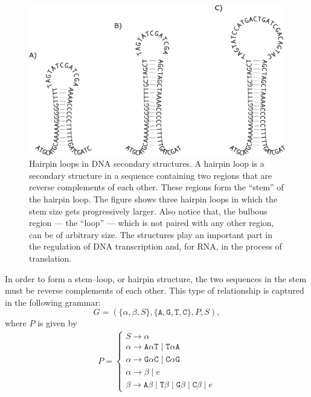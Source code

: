             \begin{figure}[ptb]
            \centering
            \includegraphics[width=\textwidth]{Body/Images-chap1/hairpin.pdf}
            \caption[Hairpin loops in DNA secondary structures]{
            Hairpin loops in DNA secondary structures.  A hairpin
            loop is a secondary structure in a sequence containing two
            regions that are reverse complements of each other.
            These regions form the ``stem'' of the hairpin loop.
            The figure shows three hairpin loops in which the stem
            size gets progressively larger.  Also notice that, the
            bulbous region --- the ``loop'' --- which is not paired
            with any other region, can be of arbitrary size.  The
            structures play an important part in the regulation of
            DNA transcription and, for RNA, in the process of
            translation.
            }
            \label{fig:hairpin}
            \end{figure}

In order to form a stem--loop, or hairpin structure, the two
sequences in the stem must be reverse complements of each other.
This type of relationship is captured in the following grammar:
\begin{equation}\label{eqn:hairpinGrammar}
    G = (\{\alpha, \beta, S\},\{\texttt{A}, \texttt{G},\texttt{T},\texttt{C}\},P,S),
\end{equation}
where $P$ is given by
\begin{align}\label{eqn:hairpinProduction}
    P =
    \begin{cases}
    S \rightarrow \alpha \\
    \alpha \rightarrow \texttt{A}\alpha\texttt{T} \mid \texttt{T}\alpha\texttt{A} \\
    \alpha \rightarrow \texttt{G}\alpha\texttt{C} \mid \texttt{C}\alpha\texttt{G} \\
    \alpha \rightarrow \beta \mid e \\
    \beta \rightarrow \texttt{A}\beta \mid \texttt{T}\beta \mid\texttt{G}\beta \mid
        \texttt{C}\beta \mid e
    \end{cases}
\end{align}


